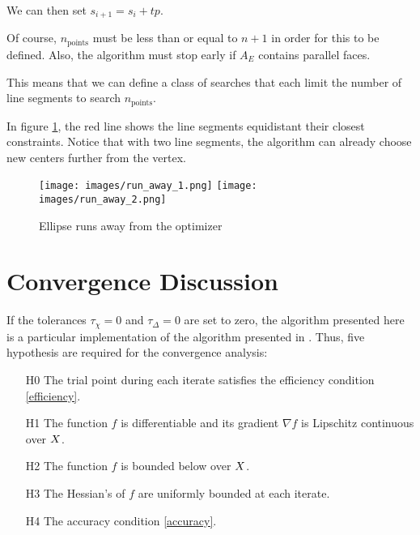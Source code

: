 We can then set $s_{i+1} = s_{i} + t p$.

Of course, $n_{\text{points}}$ must be less than or equal to $n + 1$ in order for this to be defined.
Also, the algorithm must stop early if $A_E$ contains parallel faces.



This means that we can define a class of searches that each limit the number of line segments to search $n_{\text{points}}$.

In figure \cref{line_can_run}, the red line shows the line segments equidistant their closest constraints.
Notice that with two line segments, the algorithm can already choose new centers further from the vertex.

\begin{figure}[h]
    \centering
    \texttt{[image: images/run\_away\_1.png]}
    \texttt{[image: images/run\_away\_2.png]}
    \caption{Ellipse runs away from the optimizer}
    \label{line_can_run}
\end{figure}




\section{Convergence Discussion}
\label{convergence_discussion}

If the tolerances $\tau_{\chi} = 0$ and $\tau_{\Delta} = 0$ are set to zero, the algorithm presented here is a particular implementation of the algorithm presented in \cite{doi:10.1080/10556788.2015.1026968}.
Thus, five hypothesis are required for the convergence analysis:

\begin{itemize}
\item[H0] The trial point during each iterate satisfies the efficiency condition \cref{efficiency}.
\item[H1] The function $f$ is differentiable and its gradient $\nabla f$ is Lipschitz continuous over $X$.
\item[H2] The function $f$ is bounded below over $X$.
\item[H3] The Hessian's of $f$ are uniformly bounded at each iterate.
\item[H4] The accuracy condition \cref{accuracy}.
\end{itemize}

